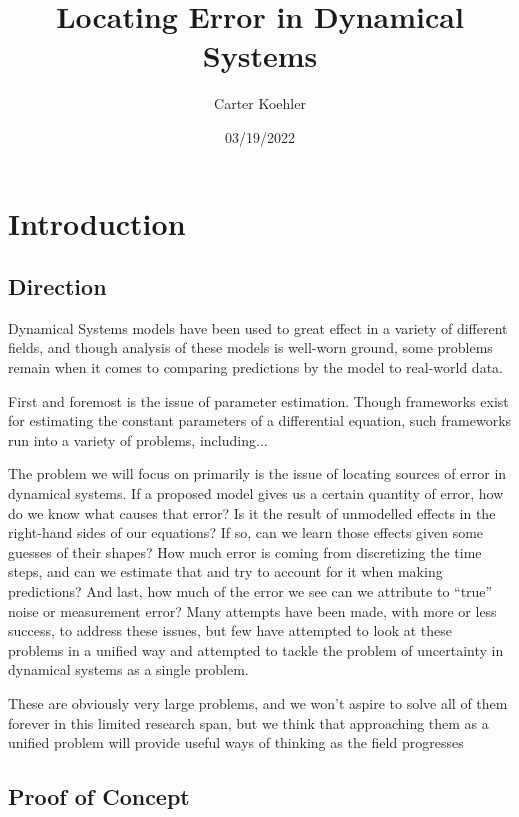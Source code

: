 \documentclass[12pt]{article}
\author{Carter Koehler}
\title{Locating Error in Dynamical Systems}
\date{03/19/2022}
\begin{document}
\maketitle



\begin{abstract}
  
\end{abstract}


\section{Introduction}

\subsection{Direction}

Dynamical Systems models have been used to great effect in a variety of different fields, and though analysis of these models is well-worn ground, some problems remain when it comes to comparing predictions by the model to real-world data.


First and foremost is the issue of parameter estimation. Though frameworks exist for estimating the constant parameters of a differential equation, such frameworks run into a variety of problems, including$\ldots$


The problem we will focus on primarily is the issue of locating sources of error in dynamical systems. If a proposed model gives us a certain quantity of error, how do we know what causes that error? Is it the result of unmodelled effects in the right-hand sides of our equations? If so, can we learn those effects given some guesses of their shapes? How much error is coming from discretizing the time steps, and can we estimate that and try to account for it when making predictions? And last, how much of the error we see can we attribute to ``true'' noise or measurement error? Many attempts have been made, with more or less success, to address these issues, but few have attempted to look at these problems in a unified way and attempted to tackle the problem of uncertainty in dynamical systems as a single problem.


These are obviously very large problems, and we won't aspire to solve all of them forever in this limited research span, but we think that approaching them as a unified problem will provide useful ways of thinking as the field progresses


\subsection{Proof of Concept}
\end{document}
